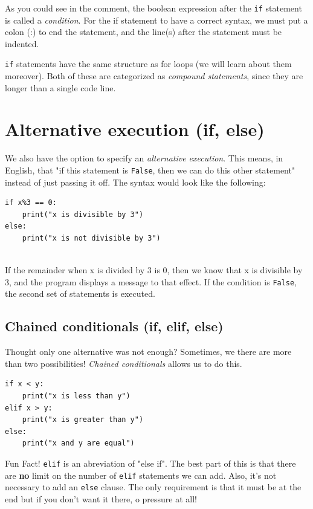 As you could see in the comment, the boolean expression after the \texttt{if} statement is called a \textit{condition}. For the if statement to have a correct syntax, we must put a colon (:) to end the statement, and the line(s) after the statement must be indented. 

\texttt{if} statements have the same structure as for loops (we will learn about them moreover). Both of these are categorized as \textit{compound statements}, since they are longer than a single code line. 

\section{Alternative execution (if, else)}
We also have the option to specify an \textit{alternative execution}. This means, in English, that "if this statement is \texttt{False}, then we can do this other statement" instead of just passing it off. The syntax would look like the following:
\begin{verbatim}
if x%3 == 0:
    print("x is divisible by 3")
else:
    print("x is not divisible by 3")
    
\end{verbatim}
If the remainder when x is divided by 3 is 0, then we know that x is divisible by 3, and the program displays a message to that effect. If the condition is \texttt{False}, the second set of statements is executed.

\subsection{Chained conditionals (if, elif, else)}
Thought only one alternative was not enough? Sometimes, we there are more than two possibilities! \textit{Chained conditionals} allows us to do this.
\begin{verbatim}
if x < y:
    print("x is less than y")
elif x > y:
    print("x is greater than y")
else:
    print("x and y are equal")
\end{verbatim}
Fun Fact! \texttt{elif} is an abreviation of "else if". The best part of this is that there are \textbf{no} limit on the number of \texttt{elif} statements we can add. Also, it's not necessary to add an \texttt{else} clause. The only requirement is that it must be at the end but if you don't want it there, o pressure at all!

\begin{center}
\end{center}

